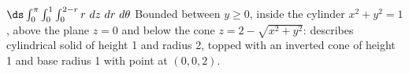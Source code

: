 {
$\ds \int_0^{\pi}\int_0^1\int_0^{2-r} r\ dz\ dr\ d\theta$
}
{Bounded between $y\geq 0$, inside the cylinder $x^2+y^2=1$, above the plane $z=0$ and below the cone $z = 2-\sqrt{x^2+y^2}$: describes cylindrical solid of height 1 and radius 2, topped with an inverted cone of height 1 and base radius 1 with point at $(0,0,2)$.
}
